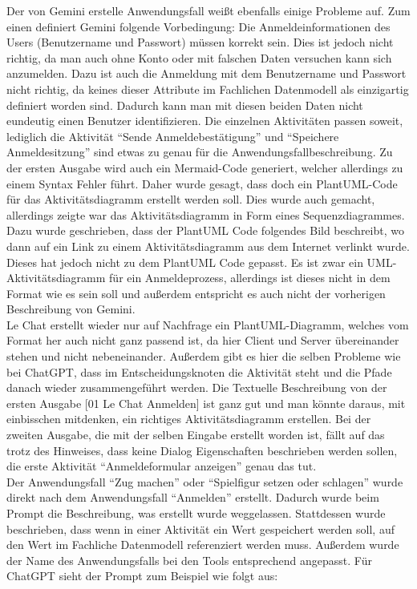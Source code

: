 Der von Gemini erstelle Anwendungsfall weißt ebenfalls einige Probleme auf. Zum einen definiert Gemini folgende Vorbedingung: Die Anmeldeinformationen des 
Users (Benutzername und Passwort) müssen korrekt sein. Dies ist jedoch nicht richtig, da man auch ohne Konto oder mit falschen Daten versuchen kann sich 
anzumelden. Dazu ist auch die Anmeldung mit dem Benutzername und Passwort nicht richtig, da keines dieser Attribute im Fachlichen Datenmodell als einzigartig
definiert worden sind. Dadurch kann man mit diesen beiden Daten nicht eundeutig einen Benutzer identifizieren. Die einzelnen Aktivitäten passen soweit, 
lediglich die Aktivität ``Sende Anmeldebestätigung'' und ``Speichere Anmeldesitzung'' sind etwas zu genau für die Anwendungsfallbeschreibung. Zu der ersten 
Ausgabe wird auch ein Mermaid-Code generiert, welcher allerdings zu einem Syntax Fehler führt. Daher wurde gesagt, dass doch ein PlantUML-Code für das 
Aktivitätsdiagramm erstellt werden soll. Dies wurde auch gemacht, allerdings zeigte war das Aktivitätsdiagramm in Form eines Sequenzdiagrammes. Dazu wurde 
geschrieben, dass der PlantUML Code folgendes Bild beschreibt, wo dann auf ein Link zu einem Aktivitätsdiagramm aus dem Internet verlinkt wurde. Dieses hat 
jedoch nicht zu dem PlantUML Code gepasst. Es ist zwar ein UML-Aktivitätsdiagramm für ein Anmeldeprozess, allerdings ist dieses nicht in dem Format wie es 
sein soll und außerdem entspricht es auch nicht der vorherigen Beschreibung von Gemini.\\

Le Chat erstellt wieder nur auf Nachfrage ein PlantUML-Diagramm, welches vom Format her auch nicht ganz passend ist, da hier Client und Server übereinander 
stehen und nicht nebeneinander. Außerdem gibt es hier die selben Probleme wie bei ChatGPT, dass im Entscheidungsknoten die Aktivität steht und die Pfade 
danach wieder zusammengeführt werden. Die Textuelle Beschreibung von der ersten Ausgabe [01 Le Chat Anmelden] ist ganz gut und man könnte daraus, mit 
einbisschen mitdenken, ein richtiges Aktivitätsdiagramm erstellen. Bei der zweiten Ausgabe, die mit der selben Eingabe erstellt worden ist, fällt auf 
das trotz des Hinweises, dass keine Dialog Eigenschaften beschrieben werden sollen, die erste Aktivität ``Anmeldeformular anzeigen'' genau das tut.\\

Der Anwendungsfall ``Zug machen'' oder ``Spielfigur setzen oder schlagen'' wurde direkt nach dem Anwendungsfall ``Anmelden'' erstellt. Dadurch wurde
beim Prompt die Beschreibung, was erstellt wurde weggelassen. Stattdessen wurde beschrieben, dass wenn in einer Aktivität ein Wert gespeichert werden
soll, auf den Wert im Fachliche Datenmodell referenziert werden muss. Außerdem wurde der Name des Anwendungsfalls bei den Tools entsprechend angepasst. 
Für ChatGPT sieht der Prompt zum Beispiel wie folgt aus:

